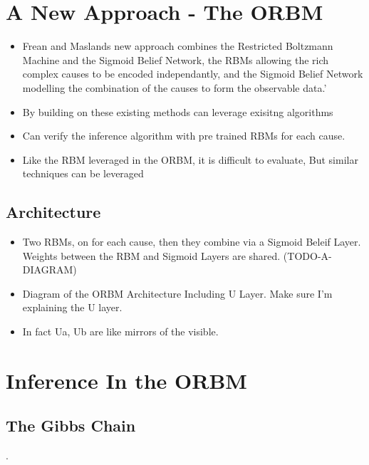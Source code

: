 \section{A New Approach - The ORBM}

\begin{itemize}
  \item Frean and Maslands new approach combines the Restricted Boltzmann Machine and the Sigmoid Belief Network, the RBMs allowing the rich complex causes to be encoded independantly, and the Sigmoid Belief Network modelling the combination of the causes to form the observable data.'
  \item By building on these existing methods can leverage exisitng algorithms
  \item Can verify the inference algorithm with pre trained RBMs for each cause.
  \item Like the RBM leveraged in the ORBM, it is difficult to evaluate, But similar techniques can be leveraged
\end{itemize}

\subsection{Architecture}

\begin{itemize}
    \item Two RBMs, on for each cause, then they combine via a Sigmoid Beleif Layer. Weights between the RBM and Sigmoid Layers are shared. (TODO-A-DIAGRAM)
    \item Diagram of the ORBM Architecture Including U Layer. Make sure I'm explaining the U layer.
    \item In fact Ua, Ub are like mirrors of the visible.
\end{itemize}


\section{Inference In the ORBM }

\subsection{The Gibbs Chain}

.

